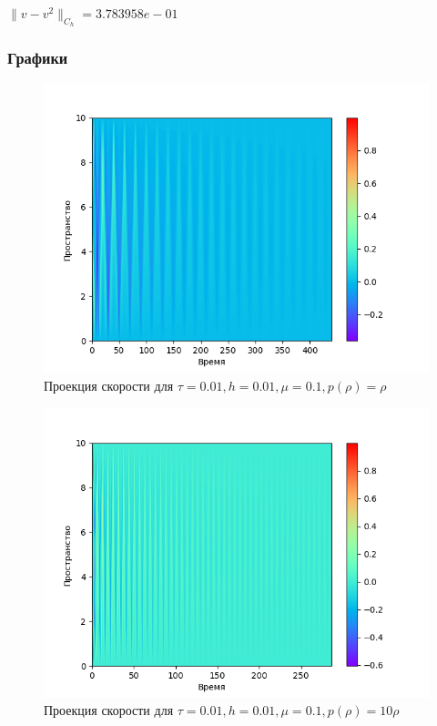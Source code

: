 $\|v-v^{2}\|_{C_h} = 3.783958e-01$

\subsubsection{Графики}
\begin{center}
\begin{figure}[H]
    \centering
    \includegraphics[height=0.4\textheight]{pics/task2/u-2-2-11_2.png}
    \caption{Проекция скорости для $\tau = 0.01, h = 0.01, \mu = 0.1, p(\rho) = \rho$}
\end{figure}

\begin{figure}[H]
    \centering
    \includegraphics[height=0.4\textheight]{pics/task2/u-2-2-12_2.png}
    \caption{Проекция скорости для $\tau = 0.01, h = 0.01, \mu = 0.1, p(\rho) = 10\rho$}
\end{figure}


\end{center}
